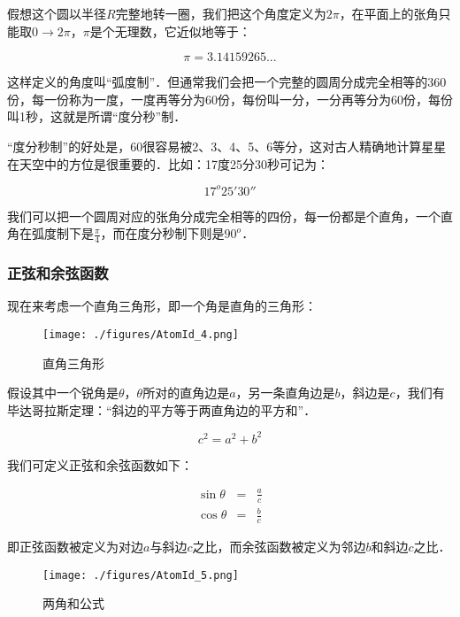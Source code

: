 假想这个圆以半径$R$完整地转一圈，我们把这个角度定义为$2 \pi$，在平面上的张角只能取$0 \to 2 \pi$，$\pi$是个无理数，它近似地等于：

\begin{equation}
\pi = 3.14159265 ...
\end{equation}

这样定义的角度叫“弧度制”．但通常我们会把一个完整的圆周分成完全相等的360份，每一份称为一度，一度再等分为60份，每份叫一分，一分再等分为60份，每份叫1秒，这就是所谓“度分秒”制．

“度分秒制”的好处是，60很容易被2、3、4、5、6等分，这对古人精确地计算星星在天空中的方位是很重要的．比如：17度25分30秒可记为：

\begin{equation}
17^o 25' 30''
\end{equation}

我们可以把一个圆周对应的张角分成完全相等的四份，每一份都是个直角，一个直角在弧度制下是$\frac{\pi}{4}$，而在度分秒制下则是$90^o$．

\subsubsection{正弦和余弦函数}

现在来考虑一个直角三角形，即一个角是直角的三角形：

\begin{figure}[ht]
\centering
\texttt{[image: ./figures/AtomId\_4.png]}
\caption{直角三角形} \label{AtomId_fig4}
\end{figure}

假设其中一个锐角是$\theta$，$\theta$所对的直角边是$a$，另一条直角边是$b$，斜边是$c$，我们有毕达哥拉斯定理：“斜边的平方等于两直角边的平方和”．

\begin{equation}
c^2 = a^2 + b^2
\end{equation}

我们可定义正弦和余弦函数如下：

\begin{eqnarray}
\sin \theta & = & \frac{a}{c} \\
\cos \theta & = & \frac{b}{c}
\end{eqnarray}

即正弦函数被定义为对边$a$与斜边$c$之比，而余弦函数被定义为邻边$b$和斜边$c$之比．

\begin{figure}[ht]
\centering
\texttt{[image: ./figures/AtomId\_5.png]}
\caption{两角和公式} \label{AtomId_fig5}
\end{figure}

